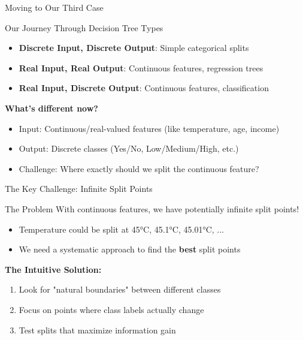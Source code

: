 \documentclass[usenames,dvipsnames]{beamer}
\begin{document}
\begin{frame}{Moving to Our Third Case}
\footnotesize
\begin{keypointsbox}{Our Journey Through Decision Tree Types}
\begin{itemize}
\item \textbf{Discrete Input, Discrete Output}: Simple categorical splits
\item \textbf{Real Input, Real Output}: Continuous features, regression trees  
\item \textbf{Real Input, Discrete Output}: Continuous features, classification
\end{itemize}
\end{keypointsbox}

\vspace{0.3em}
\textbf{What's different now?}
\begin{itemize}
\item Input: Continuous/real-valued features (like temperature, age, income)
\item Output: Discrete classes (Yes/No, Low/Medium/High, etc.)
\item Challenge: Where exactly should we split the continuous feature?
\end{itemize}
\end{frame}

\begin{frame}{The Key Challenge: Infinite Split Points}
\scriptsize
\begin{alertbox}{The Problem}
With continuous features, we have potentially infinite split points!
\begin{itemize}
\item Temperature could be split at 45°C, 45.1°C, 45.01°C, ...
\item We need a systematic approach to find the \textbf{best} split points
\end{itemize}
\end{alertbox}

\vspace{0.3em}
\textbf{The Intuitive Solution:}
\begin{enumerate}
\item Look for "natural boundaries" between different classes
\item Focus on points where class labels actually change  
\item Test splits that maximize information gain
\end{enumerate}
\end{frame}
\end{document}
